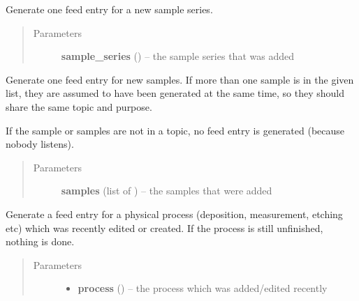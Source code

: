 \documentclass[a4paper,11pt,english]{sphinxmanual}
\begin{document}
\begin{fulllineitems}

\begin{fulllineitems}
\label{programming/utilities:samples.utils.views.Reporter.report_new_sample_series}
Generate one feed entry for a new sample series.
\begin{quote}\begin{description}
\item[{Parameters}] \leavevmode
\textbf{sample\_series} () -- the sample series that was added

\end{description}\end{quote}

\end{fulllineitems}


\begin{fulllineitems}
\label{programming/utilities:samples.utils.views.Reporter.report_new_samples}
Generate one feed entry for new samples.  If more than one sample
is in the given list, they are assumed to have been generated at the
same time, so they should share the same topic and purpose.

If the sample or samples are not in a topic, no feed entry is generated
(because nobody listens).
\begin{quote}\begin{description}
\item[{Parameters}] \leavevmode
\textbf{samples} (list of ) -- the samples that were added

\end{description}\end{quote}

\end{fulllineitems}


\begin{fulllineitems}
\label{programming/utilities:samples.utils.views.Reporter.report_physical_process}
Generate a feed entry for a physical process (deposition,
measurement, etching etc) which was recently edited or created.  If the
process is still unfinished, nothing is done.
\begin{quote}\begin{description}
\item[{Parameters}] \leavevmode\begin{itemize}
\item {} 
\textbf{process} () -- the process which was added/edited recently


\end{itemize}
\end{description}
\end{quote}
\end{fulllineitems}
\end{fulllineitems}
\end{document}
